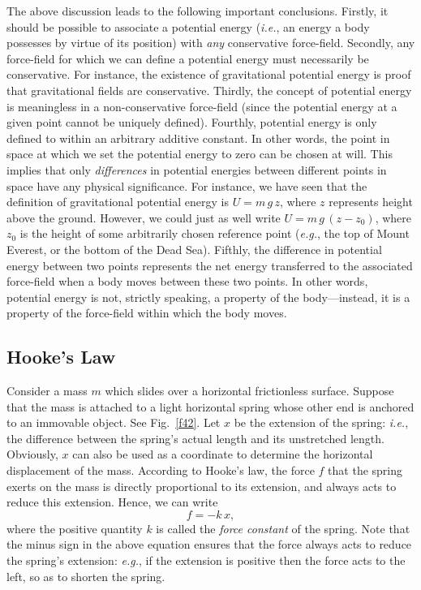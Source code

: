 The above discussion leads to the following important conclusions. Firstly,
it should be possible to associate a potential energy ({\em i.e.}, an energy
a body possesses by virtue of its position) with {\em any} conservative
force-field. Secondly, any force-field for which we can define
a potential energy must necessarily be conservative. For instance, the existence
of gravitational potential energy is proof that gravitational fields
are conservative.
Thirdly, the concept of potential energy is meaningless
in a non-conservative force-field (since the potential energy at a
given point cannot be uniquely defined). Fourthly, potential energy is
only defined to within an arbitrary additive constant. In other words,
the point in space at which we set the potential energy to zero
can be chosen at will. This implies that only {\em differences} in potential
energies between different points in space have any physical
significance. For instance, we have seen that the definition of
gravitational potential energy is $U=m\,g\,z$, where $z$ represents height above
the ground. However, we could just as well write $U=m\,g\,(z-z_0)$, where
$z_0$ is the height of some arbitrarily chosen reference point
({\em e.g.}, the top of Mount Everest, or the bottom of the
Dead Sea). Fifthly, the difference in potential energy between two points
represents the net energy transferred to the associated force-field when a body moves
between these two points. In other words, potential energy is not, strictly speaking,  a
property of the body---instead, it is a property of the force-field within which
the body  moves.

\subsection{Hooke's Law}\label{s56}
Consider a mass $m$ which slides over a horizontal frictionless surface. Suppose that
the mass is attached
to a light horizontal spring whose other end is anchored to an immovable object. See
Fig.~\ref{f42}. Let $x$ be the extension of the spring: {\em i.e.}, the difference between
the spring's actual length and its unstretched length. Obviously, $x$ can also be used as
a coordinate to determine the horizontal displacement of the mass. 
According to Hooke's law, the force
$f$ that the spring exerts on the mass is directly proportional to its extension, and always acts to reduce
this extension. 
Hence, we can write
\begin{equation}
f = -k\,x,
\end{equation}
where the positive quantity $k$ is called the {\em force constant} of the spring. Note that
the minus sign in the above equation ensures that the force always acts to reduce the 
spring's extension:
{\em e.g.}, if the extension is positive then the force acts to the left, so as to
shorten the spring. 

